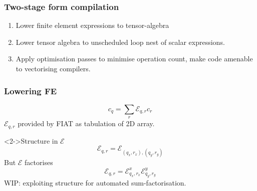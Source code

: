 \documentclass[presentation]{beamer}
\begin{document}
\begin{frame}
  \frametitle{Two-stage form compilation}
  \begin{enumerate}[<+->]
  \item Lower finite element expressions to tensor-algebra
  \item Lower tensor algebra to unscheduled loop nest of scalar
    expressions.
  \item Apply optimisation passes to minimise operation count, make
    code amenable to vectorising compilers.
  \end{enumerate}
\end{frame}
\begin{frame}
  \frametitle{Lowering FE}
  \begin{equation*}
    c_q = \sum_r \mathcal{E}_{q, r} c_r
  \end{equation*}
  $\mathcal{E}_{q, r}$ provided by FIAT as tabulation of 2D array.
  \begin{block}<2->{Structure in $\mathcal{E}$}
    \begin{equation*}
      \mathcal{E}_{q,r} = \mathcal{E}_{(q_x,r_x),(q_y, r_y)}
    \end{equation*}
    But $\mathcal{E}$ factorises
    \begin{equation*}
      \mathcal{E}_{q, r} = \mathcal{E}^x_{q_x, r_x}
      \mathcal{E}^y_{q_y, r_y}
    \end{equation*}
    WIP: exploiting structure for automated sum-factorisation.
  \end{block}
\end{frame}
\end{document}
